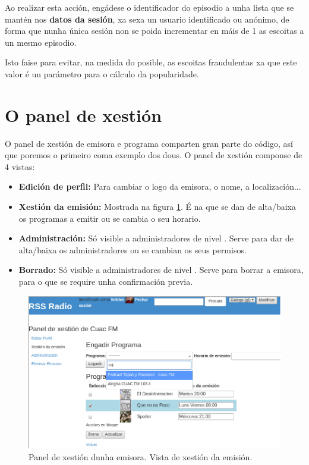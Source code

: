 Ao realizar esta acción, engádese o identificador do episodio a unha lista que se mantén nos \textbf{datos da sesión}, xa sexa un usuario identificado ou anónimo, de forma que nunha única sesión non se poida incrementar en máis de 1 as escoitas a un mesmo episodio. 

Isto faise para evitar, na medida do posible, as escoitas fraudulentas xa que este valor é un parámetro para o cálculo da popularidade.

 

\section{O panel de xestión}

O panel de xestión de emisora e programa comparten gran parte do código, así que poremos o primeiro coma exemplo dos dous. O panel de xestión componse de 4 vistas: 

\begin{itemize}
	\item \textbf{Edición de perfil:} Para cambiar o logo da emisora, o nome, a localización...
	
	\item \textbf{Xestión da emisión:} Mostrada na figura \ref{fig:panel}. É na que se dan de alta/baixa os programas a emitir ou se cambia o seu horario.
	
	\item \textbf{Administración:} Só visible a administradores de nivel . Serve para dar de alta/baixa os administradores ou se cambian os seus permisos.
	
	\item \textbf{Borrado:}  Só visible a administradores de nivel . Serve para borrar a emisora, para o que se require unha confirmación previa.
	
\end{itemize}

\begin{figure}[H]
	\centering
	\includegraphics[scale=0.45,keepaspectratio=true]{./images/impl-panel.png}
	\caption{Panel de xestión dunha emisora. Vista de xestión da emisión. }
	\label{fig:panel}
\end{figure} 

